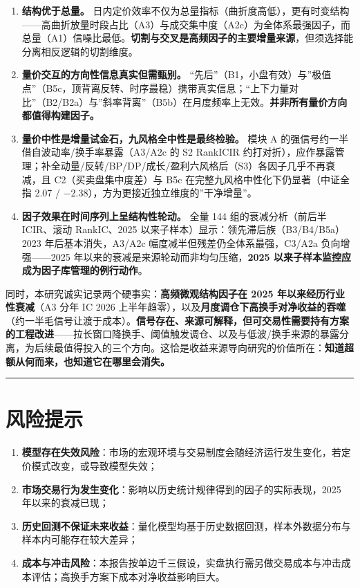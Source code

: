 \documentclass[UTF8,a4paper,zihao=-4,fontset=windows]{ctexart}
\providecommand{\tightlist}{\setlength{\itemsep}{0pt}\setlength{\parskip}{0pt}}
\begin{document}
\begin{enumerate}
\def\labelenumi{\arabic{enumi}.}
\tightlist
\item
  \textbf{结构优于总量。}
  日内定价效率不仅为总量指标（曲折度高低），更有时变结构------高曲折放量时段占比（A3）与成交集中度（A2c）为全体系最强因子，而总量（A1）信噪比最低。\textbf{切割与交叉是高频因子的主要增量来源}，但须选择能分离相反逻辑的切割维度。
\item
  \textbf{量价交互的方向性信息真实但需甄别。}
  ``先后''（B1，小盘有效）与''极值点''（B5c，顶背离反转、时序最稳）携带真实信息；``上下力量对比''（B2/B2a）与''斜率背离''（B5b）在月度频率上无效。\textbf{并非所有量价方向都值得构建因子。}
\item
  \textbf{量价中性是增量试金石，九风格全中性是最终检验。} 模块 A
  的强信号约一半借自波动率/换手率暴露（A3/A2c 的 S2 RankICIR
  约打对折），应作暴露管理；补全动量/反转/BP/DP/成长/盈利六风格后（S3）各因子几乎不再衰减，且
  C2（买卖盘集中度差）与 B5c 在完整九风格中性化下仍显著（中证全指 2.07 /
  −2.38），方为更接近独立维度的''干净增量''。
\item
  \textbf{因子效果在时间序列上呈结构性轮动。} 全量 144
  组的衰减分析（前后半 ICIR、滚动 RankIC、2025
  以来子样本）显示：领先滞后族（B3/B4/B5a）2023 年后基本消失，A3/A2c
  幅度减半但残差仍全体系最强，C3/A2a 负向增强------2025
  年以来的衰减是来源轮动而非均匀压缩，\textbf{2025
  以来子样本监控应成为因子库管理的例行动作}。
\end{enumerate}

同时，本研究诚实记录两个硬事实：\textbf{高频微观结构因子在 2025
年以来经历行业性衰减}（A3 分年 IC 2026
上半年趋零），以及\textbf{月度调仓下高换手对净收益的吞噬}（约一半毛信号让渡于成本）。\textbf{信号存在、来源可解释，但可交易性需要持有方案的工程改进}------拉长窗口降换手、阈值触发调仓、以及与低波/换手来源的暴露分离，为后续最值得投入的三个方向。这恰是收益来源导向研究的价值所在：\textbf{知道超额从何而来，也知道它在哪里会消失。}

\begin{center}\rule{0.5\linewidth}{0.5pt}\end{center}

\section{风险提示}\label{ux98ceux9669ux63d0ux793a}

\begin{enumerate}
\def\labelenumi{\arabic{enumi}.}
\tightlist
\item
  \textbf{模型存在失效风险}：市场的宏观环境与交易制度会随经济运行发生变化，若定价模式改变，或导致模型失效；
\item
  \textbf{市场交易行为发生变化}：影响以历史统计规律得到的因子的实际表现，2025
  年以来的衰减已现；
\item
  \textbf{历史回测不保证未来收益}：量化模型均基于历史数据回测，样本外数据分布与样本内可能存在较大差异；
\item
  \textbf{成本与冲击风险}：本报告按单边千三假设，实盘执行需另做交易成本与冲击成本评估；高换手方案下成本对净收益影响巨大。
\end{enumerate}
\end{document}
